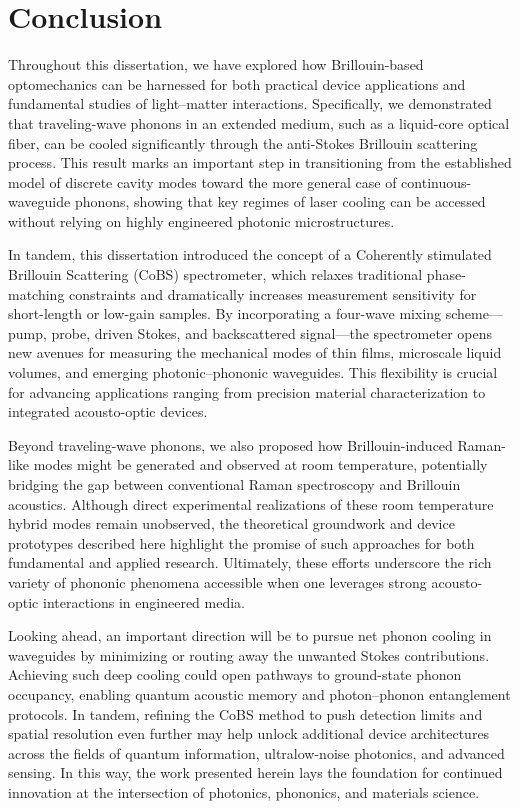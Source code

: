 \chapter{Conclusion}
\label{ch:Conclusion}
\acresetall

Throughout this dissertation, we have explored how Brillouin-based optomechanics can be harnessed for both practical device applications and fundamental studies of light–matter interactions. Specifically, we demonstrated that traveling-wave phonons in an extended medium, such as a liquid-core optical fiber, can be cooled significantly through the anti-Stokes Brillouin scattering process. This result marks an important step in transitioning from the established model of discrete cavity modes toward the more general case of continuous-waveguide phonons, showing that key regimes of laser cooling can be accessed without relying on highly engineered photonic microstructures.

In tandem, this dissertation introduced the concept of a Coherently stimulated Brillouin Scattering (\acs{CoBS}) spectrometer, which relaxes traditional phase-matching constraints and dramatically increases measurement sensitivity for short-length or low-gain samples. By incorporating a four-wave mixing scheme—pump, probe, driven Stokes, and backscattered signal—the spectrometer opens new avenues for measuring the mechanical modes of thin films, microscale liquid volumes, and emerging photonic–phononic waveguides. This flexibility is crucial for advancing applications ranging from precision material characterization to integrated acousto-optic devices.

Beyond traveling-wave phonons, we also proposed how Brillouin-induced Raman-like modes might be generated and observed at room temperature, potentially bridging the gap between conventional Raman spectroscopy and Brillouin acoustics. Although direct experimental realizations of these room temperature hybrid modes remain unobserved, the theoretical groundwork and device prototypes described here highlight the promise of such approaches for both fundamental and applied research. Ultimately, these efforts underscore the rich variety of phononic phenomena accessible when one leverages strong acousto-optic interactions in engineered media.

Looking ahead, an important direction will be to pursue net phonon cooling in waveguides by minimizing or routing away the unwanted Stokes contributions. Achieving such deep cooling could open pathways to ground-state phonon occupancy, enabling quantum acoustic memory and photon–phonon entanglement protocols. In tandem, refining the CoBS method to push detection limits and spatial resolution even further may help unlock additional device architectures across the fields of quantum information, ultralow-noise photonics, and advanced sensing. In this way, the work presented herein lays the foundation for continued innovation at the intersection of photonics, phononics, and materials science.

\clearpage
\thispagestyle{empty}
\null
\newpage
